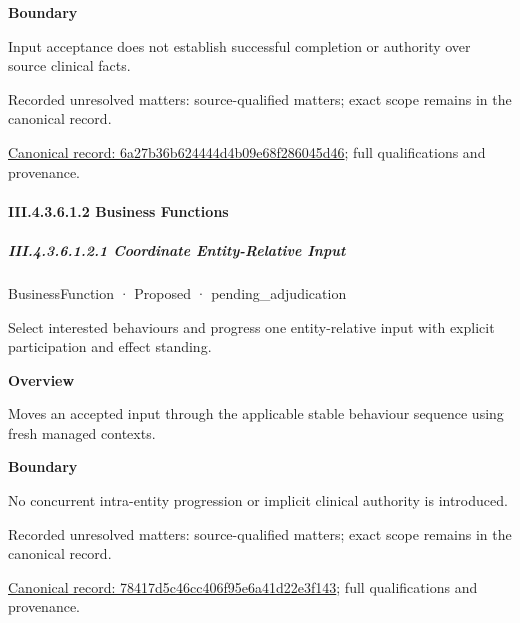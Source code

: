 \textbf{Boundary}



Input acceptance does not establish successful completion or authority over source clinical facts.


{\small Recorded unresolved matters: source-qualified matters; exact scope remains in the canonical record.}\par
{\footnotesize \href{../../../../../../../continuum/business/business-service/6a27b36b624444d4b09e68f286045d46.md}{Canonical record: 6a27b36b624444d4b09e68f286045d46}; full qualifications and provenance.}\par
\paragraph*{III.4.3.6.1.2 Business Functions}
\label{navigation:III.4.3.6.1.2}

\subparagraph*{III.4.3.6.1.2.1 Coordinate Entity-Relative Input}
\label{navigation:III.4.3.6.1.2.1}

\label{element:78417d5c46cc406f95e6a41d22e3f143}
{\small BusinessFunction · Proposed · pending\_adjudication}\par

Select interested behaviours and progress one entity-relative input with explicit participation and effect standing.



\textbf{Overview}



Moves an accepted input through the applicable stable behaviour sequence using fresh managed contexts.



\textbf{Boundary}



No concurrent intra-entity progression or implicit clinical authority is introduced.


{\small Recorded unresolved matters: source-qualified matters; exact scope remains in the canonical record.}\par
{\footnotesize \href{../../../../../../../continuum/business/business-function/78417d5c46cc406f95e6a41d22e3f143.md}{Canonical record: 78417d5c46cc406f95e6a41d22e3f143}; full qualifications and provenance.}\par
